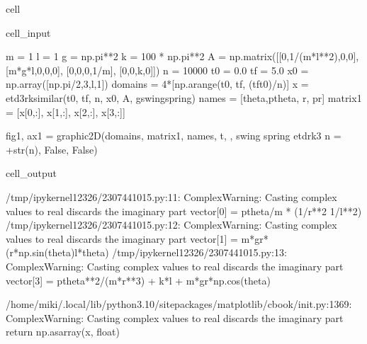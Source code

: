 \documentclass[letterpaper,10pt,english]{jupyterBook}
\begin{document}
\begin{sphinxuseclass}{cell}\begin{sphinxVerbatimInput}

\begin{sphinxuseclass}{cell_input}
\begin{sphinxVerbatim}[commandchars=\\\{\}]
m = 1
l = 1
g = np.pi**2
k = 100 * np.pi**2
A = np.matrix([[0,\PYGZhy{}1/(m*l**2),0,0], [m*g*l,0,0,0], [0,0,0,\PYGZhy{}1/m], [0,0,k,0]])
n = 10000
t0 = 0.0
tf = 5.0
x0 = np.array([np.pi/2,3,l,1])
domains = 4*[np.arange(t0, tf, (tf\PYGZhy{}t0)/n)]
x = etd3rk\PYGZus{}similar(t0, tf, n, x0, A, g\PYGZus{}swing\PYGZus{}spring)
names = [\PYGZsq{}theta\PYGZsq{},\PYGZsq{}p\PYGZus{}theta\PYGZsq{}, \PYGZsq{}r\PYGZsq{}, \PYGZsq{}pr\PYGZsq{}]
matrix1 = [x[0,:], x[1,:], x[2,:], x[3,:]]

fig1, ax1 = graphic\PYGZus{}2D(domains, matrix1, names, \PYGZsq{}t\PYGZsq{}, \PYGZsq{} \PYGZsq{}, \PYGZsq{}swing spring etdrk3 n = \PYGZsq{}+str(n), False, False)
\end{sphinxVerbatim}

\end{sphinxuseclass}\end{sphinxVerbatimInput}
\begin{sphinxVerbatimOutput}

\begin{sphinxuseclass}{cell_output}
\begin{sphinxVerbatim}[commandchars=\\\{\}]
/tmp/ipykernel\PYGZus{}12326/2307441015.py:11: ComplexWarning: Casting complex values to real discards the imaginary part
  vector[0] = p\PYGZus{}theta/m * (1/r**2 \PYGZhy{} 1/l**2)
/tmp/ipykernel\PYGZus{}12326/2307441015.py:12: ComplexWarning: Casting complex values to real discards the imaginary part
  vector[1] = \PYGZhy{}m*gr*(r*np.sin(theta)\PYGZhy{}l*theta)
/tmp/ipykernel\PYGZus{}12326/2307441015.py:13: ComplexWarning: Casting complex values to real discards the imaginary part
  vector[3] = p\PYGZus{}theta**2/(m*r**3) + k*l + m*gr*np.cos(theta)
\end{sphinxVerbatim}

\begin{sphinxVerbatim}[commandchars=\\\{\}]
/home/miki/.local/lib/python3.10/site\PYGZhy{}packages/matplotlib/cbook/\PYGZus{}\PYGZus{}init\PYGZus{}\PYGZus{}.py:1369: ComplexWarning: Casting complex values to real discards the imaginary part
  return np.asarray(x, float)
\end{sphinxVerbatim}

\noindent{}

\end{sphinxuseclass}\end{sphinxVerbatimOutput}

\end{sphinxuseclass}
\sphinxstepscope
\end{document}
